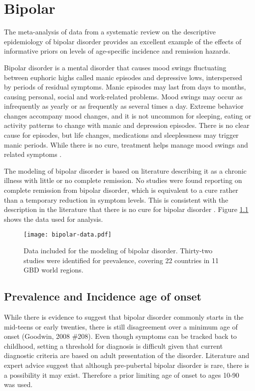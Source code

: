 \chapter{Bipolar}
\label{applications-prior_level_vals}

The meta-analysis of data from a systematic review on the descriptive epidemiology of bipolar disorder provides an excellent example of the effects of informative priors on levels of age-specific incidence and remission hazards.

Bipolar disorder is a mental disorder that causes mood swings fluctuating between euphoric highs called manic episodes and depressive lows, interspersed by periods of residual symptoms.  Manic episodes may last from days to months, causing personal, social and work-related problems.  Mood swings may occur as infrequently as yearly or as frequently as several times a day.  Extreme behavior changes accompany mood changes, and it is not uncommon for sleeping, eating or activity patterns to change with manic and depression episodes.  There is no clear cause for episodes, but life changes, medications and sleeplessness may trigger manic periods.  While there is no cure, treatment helps manage mood swings and related symptoms \cite{american_diagnostic_2000, national_bipolar_2012, national_bipolar_2011, mayo_bipolar_2012}.

The modeling of bipolar disorder is based on literature describing it as a chronic illness with little or no complete remission.  No studies were found reporting on complete remission from bipolar disorder, which is equivalent to a cure rather than a temporary reduction in symptom levels.  This is consistent with the description in the literature that there is no cure for bipolar disorder \cite{american_diagnostic_2000}.  Figure \ref{fig:app-bipolar data} shows the data used for analysis.

    \begin{figure}[h]
        \begin{center}
            \texttt{[image: bipolar-data.pdf]}
            \caption{Data included for the modeling of bipolar disorder.  Thirty-two studies were identified for prevalence, covering 22 countries in 11 GBD world regions.}
            \label{fig:app-bipolar data}
        \end{center}
    \end{figure}

\section{Prevalence and Incidence age of onset}
While there is evidence to suggest that bipolar disorder commonly starts in the mid-teens or early twenties, there is still disagreement over a minimum age of onset (Goodwin, 2008 \#208). Even though symptoms can be tracked back to childhood, setting a threshold for diagnosis is difficult given that current diagnostic criteria are based on adult presentation of the disorder. Literature and expert advice suggest that although pre-pubertal bipolar disorder is rare, there is a possibility it may exist. Therefore a prior limiting age of onset to ages 10-90 was used.

